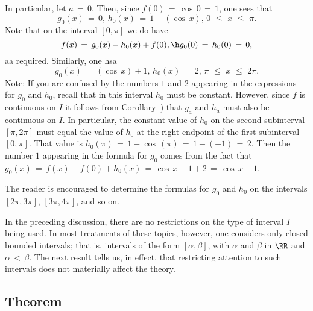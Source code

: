         In particular, let $a \,=\, 0$. Then, since $f(0) \,=\, {\cos}\,0 \,=\, 1$, one sees that
        \begin{displaymath}
        g_{0}(x) \,=\, 0, \, h_{0}(x) \,=\, 1-({\cos}\,x), \, 
    0\,\,{\leq}\,\,x\,\,{\leq}\,\,{\pi}.
        \end{displaymath}
    Note that on the interval $[0,{\pi}]$ we do have
        \begin{displaymath}
        f(x) \,=\, g_{0}(x)-h_{0}(x) + f(0), \h g_{0}(0) \,=\, h_{0}(0) \,=\, 0,
        \end{displaymath}
    aa required. Similarly, one hsa
        \begin{displaymath}
        g_{0}(x) \,=\, ({\cos}\,x)+1, \, h_{0}(x) \,=\, 2, \,
    {\pi}\,\,{\leq}\,\,x\,\,{\leq}\,\,2{\pi}.
        \end{displaymath}
    Note: If you are confused by the numbers $1$ and $2$ appearing in the expressions for $g_{0}$ and $h_{0}$,
    recall that in this interval $h_{0}$ must be constant. However, since $f$ is continuous on $I$ it follows from Corollary~) that $g_{a}$ and $h_{a}$ must also be continuous on $I$.
    In particular, the constant value of $h_{0}$ on the second subinterval $[{\pi},2{\pi}]$ must equal the value of $h_{0}$ at the right endpoint of the first subinterval $[0,{\pi}]$.
    That value is $h_{0}({\pi}) \,=\, 1-{\cos}\,({\pi}) \,=\, 1-(-1) \,=\, 2$.
    Then the number $1$ appearing in the formula for $g_{0}$ comes from the fact that $g_{0}(x) \,=\, f(x)-f(0)+h_{0}(x) \,=\, {\cos}\,x-1+2 \,=\, {\cos}\,x+1$.

        The reader is encouraged to determine the formulas for $g_{0}$ and $h_{0}$ on the intervals $[2{\pi},3{\pi}]$, $[3{\pi},4{\pi}]$, and so on.

\V
\V

        In the preceding discussion, there are no restrictions on the type of interval $I$ being used.
    In most treatments of these topics, however, one considers only closed bounded intervals;
    that is, intervals of the form $[{\alpha},{\beta}]$, with ${\alpha}$ and ${\beta}$ in ${\RR}$ and ${\alpha}\,<\,{\beta}$.
    The next result tells us, in effect, that restricting attention to such intervals does not materially affect the theory.

\V
             \subsection{\small{\bf Theorem}}
            \label{ThmF40.180}

